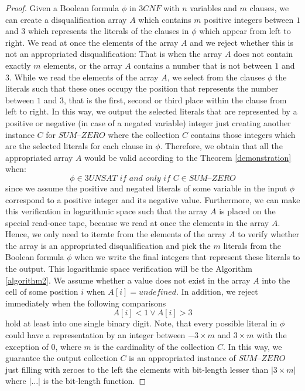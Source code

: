 \documentclass[a4paper,UKenglish,cleveref, autoref]{lipics-v2019}
\begin{document}
\begin{proof}
Given a Boolean formula $\phi$ in $3CNF$ with $n$ variables and $m$ clauses, we can create a disqualification array $A$ which contains $m$ positive integers between $1$ and $3$ which represents the literals of the clauses in $\phi$ which appear from left to right. We read at once the elements of the array $A$ and we reject whether this is not an appropriated disqualification: That is when the array $A$ does not contain exactly $m$ elements, or the array $A$ contains a number that is not between $1$ and $3$. While we read the elements of the array $A$, we select from the clauses $\phi$ the literals such that these ones occupy the position that represents the number between $1$ and $3$, that is the first, second or third place within the clause from left to right. In this way, we output the selected literals that are represented by a positive or negative (in case of a negated variable) integer just creating another instance $C$ for $\textit{SUM--ZERO}$ where the collection $C$ contains those integers which are the selected literals for each clause in $\phi$. Therefore, we obtain that all the appropriated array $A$ would be valid according to the Theorem \ref{demonstration} when:
\[\phi \in 3UNSAT \textit{ if and only if } C \in \textit{SUM--ZERO}\]
since we assume the positive and negated literals of some variable in the input $\phi$ correspond to a positive integer and its negative value. Furthermore, we can make this verification in logarithmic space such that the array $A$ is placed on the special read-once tape, because we read at once the elements in the array $A$. Hence, we only need to iterate from the elements of the array $A$ to verify whether the array is an appropriated disqualification and pick the $m$ literals from the Boolean formula $\phi$ when we write the final integers that represent these literals to the output. This logarithmic space verification will be the Algorithm \ref{algorithm2}. We assume whether a value does not exist in the array $A$ into the cell of some position $i$ when $A[i] = \textit{undefined}$. In addition, we reject immediately when the following comparisons
\[A[i] < 1 \vee A[i] > 3\]
hold at least into one single binary digit. Note, that every possible literal in $\phi$ could have a representation by an integer between $-3 \times m$ and $3 \times m$ with the exception of $0$, where $m$ is the cardinality of the collection $C$. In this way, we guarantee the output collection $C$ is an appropriated instance of $\textit{SUM--ZERO}$ just filling with zeroes to the left the elements with bit-length lesser than $|3 \times m|$ where $|\ldots|$ is the bit-length function.


\end{proof}
\end{document}
